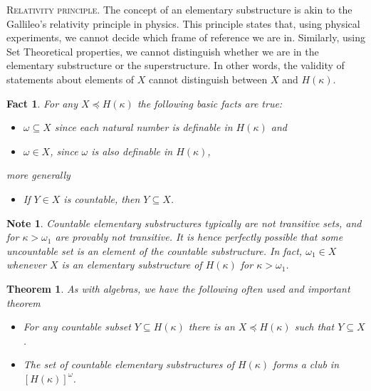 \documentclass[a4paper,11pt,oneside]{mybook}
\theoremstyle{theorem}
\newtheorem{theorem}[subsection]{Theorem}
\newtheorem{fact}[subsection]{Fact}
\theoremstyle{example}
\newtheorem*{note}{Note}
\begin{document}
{{\scshape Relativity principle.} The concept of an elementary substructure is akin to the Gallileo's relativity principle in physics. This principle states that, using physical
experiments, we cannot decide which frame of reference we are in. Similarly, using Set Theoretical properties, we cannot distinguish
whether we are in the elementary substructure or the superstructure. In other words, the validity of statements about elements of $X$
cannot distinguish between $X$ and $H(\kappa)$.



\begin{fact}
For any $X\preceq H(\kappa)$ the following basic facts are true:
\begin{itemize}
  \item[(i)] $\omega\subseteq X$ since each natural number is definable in $H(\kappa)$ and
  \item[(ii)] $\omega\in X$, since $\omega$ is also definable in $H(\kappa)$,
\end{itemize}
more generally
\begin{itemize}
  \item[(iii)] If $Y\in X$ is countable, then $Y\subseteq X$.
\end{itemize}
\end{fact}

\begin{note}
Countable elementary substructures typically are not transitive sets, and for $\kappa>\omega_1$ are provably not transitive.
             It is hence perfectly possible that some uncountable set is an \emph{element} of the countable substructure. In fact,
             $\omega_1\in X$ whenever $X$ is an elementary substructure of $H(\kappa)$ for $\kappa>\omega_1$.
\end{note}

\begin{theorem}
As with algebras, we have the following often used and important theorem
\begin{itemize}
  \item[(i)] For any countable subset $Y\subseteq H(\kappa)$ there is an
	$X\preceq H(\kappa)$ such that $Y\subseteq X$.
  \item[(ii)] The set of countable elementary substructures of $H(\kappa)$
	forms a club in $[H(\kappa)]^\omega$.
\end{itemize}
\end{theorem}

}
\end{document}
